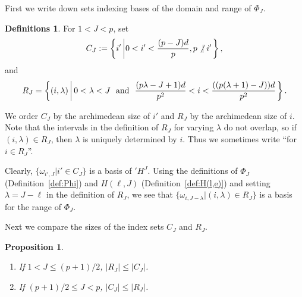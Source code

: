 \documentclass[12pt,reqno]{amsart}
\numberwithin{equation}{section}
\theoremstyle{plain}
\newtheorem{prop}[subsection]{Proposition}
\theoremstyle{definition}
\newtheorem{defns}[subsection]{Definitions}
\theoremstyle{remark}
\numberwithin{equation}{section}
\newcommand{\<}{\langle}
\renewcommand{\>}{\rangle}
\newcommand{\nodiv}{\not|}
\def\nodiv{\mathrel{\mathchoice{\not|}{\not|}{\kern-.2em\not\kern.2em|}
{\kern-.2em\not\kern.2em|}}}
\def\prH{{}'H^J}
\begin{document}
First we write down sets
indexing bases of the domain and range of
$\Phi_J$.

\begin{defns}\label{def:C+R}
For $1<J<p$, set  
\[C_J:=\left\{i'\left| 0<i'<\frac{(p-J)d}{p}, p\nodiv
      i'\right.\right\},\]
and
\[R_J=\left\{(i,\lambda)\left|\, 0<\lambda<J\text{ \ and \
      }\frac{(p\lambda-J+1)d}{p^2}
      <i<\frac{((p(\lambda+1)-J))d}{p^2}\right.\right\}.\]
\end{defns}

We order $C_J$ by the archimedean size of $i'$ and $R_J$ by the
archimedean size of $i$.  Note that the intervals in the definition of
$R_J$ for varying $\lambda$ do not overlap, so if
$(i,\lambda)\in R_J$, then $\lambda$ is uniquely determined by $i$.
Thus we sometimes write ``for $i\in R_J$''.


Clearly, $\{\omega_{i',J}|i'\in C_J\}$ is a basis of $\prH$.  Using
the definitions of $\Phi_J$ (Definition~\ref{def:Phi}) and $H(\ell,J)$
(Definition~\ref{def:H(l,e)}) and setting $\lambda=J-\ell$ in the
definition of $R_J$, we see that
$\{\omega_{i,J-\lambda}|(i,\lambda)\in R_J\}$ is a basis for the range
of $\Phi_J$.

Next we compare the sizes of the index sets $C_J$ and $R_J$.

\begin{prop}\label{prop:comp}\mbox{}
  \begin{enumerate}
  \item If $1< J\le(p+1)/2$, $|R_J|\le |C_J|$.
  \item If $(p+1)/2\le J<p$, $|C_J|\le |R_J|$.
  \end{enumerate}
\end{prop}
\end{document}
